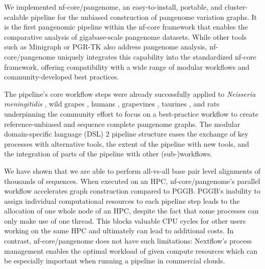 \documentclass{bioinfo}
\theoremstyle{definition}
\begin{document}
	We implemented nf-core/pangenome, an easy-to-install, portable, and cluster-scalable pipeline for the unbiased construction of pangenome variation graphs.  
    It is the first pangenomic pipeline within the nf-core framework that enables the comparative analysis of gigabase-scale pangenome datasets. 
    While other tools such as Minigraph \citep{Li_2020} or PGR-TK \citep{Chin2023} also address pangenome analysis, nf-core/pangenome uniquely integrates this capability into the standardized nf-core framework, offering compatibility with a wide range of modular workflows and community-developed best practices.
    
	The pipeline’s core workflow steps were already successfully applied to \textit{Neisseria meningitidis} \citep{Yang2023}, wild grapes \citep{Cochetel2023}, humans \citep{Guarracino2023, Liao2023}, grapevines \citep{Guo2024}, taurines \citep{Milia2024}, and rats \citep{Villani2024} underpinning the community effort to focus on a best-practice workflow to create reference-unbiased and sequence complete pangenome graphs. 
	The modular domain-specific language (DSL) 2 pipeline structure eases the exchange of key processes with alternative tools, the extent of the pipeline with new tools, and the integration of parts of the pipeline with other (sub-)workflows.
	
	We have shown that we are able to perform all-vs-all base pair level alignments of thousands of sequences. 
	When executed on an HPC, nf-core/pangenome’s parallel workflow accelerates graph construction compared to PGGB. 
	PGGB’s inability to assign individual computational resources to each pipeline step leads to the allocation of one whole node of an HPC, despite the fact that some processes can only make use of one thread. 
	This blocks valuable CPU cycles for other users working on the same HPC and ultimately can lead to additional costs.
	In contrast, %
	nf-core/pangenome does not have such limitations: 
	Nextflow’s process management enables the optimal workload of given compute resources which can be especially important when running a pipeline in commercial clouds. %
	
\end{document}
